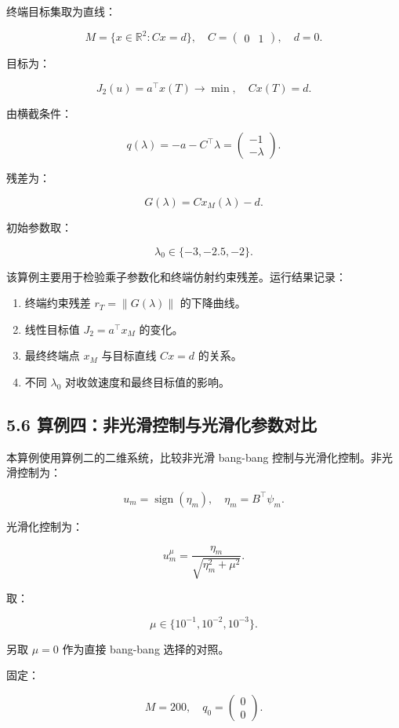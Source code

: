 \documentclass[UTF8,a4paper,zihao=-4]{ctexart}
\begin{document}
终端目标集取为直线：

\[
M=\{x\in\mathbb{R}^2:Cx=d\},
\quad
C=
\begin{pmatrix}
0&1
\end{pmatrix},
\quad
d=0.
\]

目标为：

\[
J_2(u)=a^\top x(T)\to\min,\quad Cx(T)=d.
\]

由横截条件：

\[
q(\lambda)=-a-C^\top\lambda
=
\begin{pmatrix}
-1\\
-\lambda
\end{pmatrix}.
\]

残差为：

\[
G(\lambda)=Cx_M(\lambda)-d.
\]

初始参数取：

\[
\lambda_0\in\{-3,-2.5,-2\}.
\]

该算例主要用于检验乘子参数化和终端仿射约束残差。运行结果记录：

\begin{enumerate}
\item 终端约束残差 $r_T=\|G(\lambda)\|$ 的下降曲线。
\item 线性目标值 $J_2=a^\top x_M$ 的变化。
\item 最终终端点 $x_M$ 与目标直线 $Cx=d$ 的关系。
\item 不同 $\lambda_0$ 对收敛速度和最终目标值的影响。
\end{enumerate}

\subsection{5.6 算例四：非光滑控制与光滑化参数对比}

本算例使用算例二的二维系统，比较非光滑 bang-bang 控制与光滑化控制。非光滑控制为：

\[
u_m=\operatorname{sign}(\eta_m),\quad \eta_m=B^\top\psi_m.
\]

光滑化控制为：

\[
u_m^\mu=\frac{\eta_m}{\sqrt{\eta_m^2+\mu^2}}.
\]

取：

\[
\mu\in\{10^{-1},10^{-2},10^{-3}\}.
\]

另取 $\mu=0$ 作为直接 bang-bang 选择的对照。

固定：

\[
M=200,\quad q_0=
\begin{pmatrix}
0\\
0
\end{pmatrix}.
\]
\end{document}
